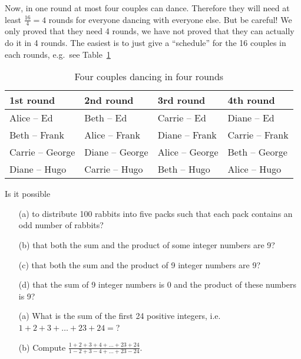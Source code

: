 Now, in one round at most four couples can dance. 
Therefore they will need at least $\frac{16}{4} = 4$ rounds for everyone dancing with everyone else. 
But be careful! 
We only proved that they need 4 rounds, 
we have not proved that they can actually do it in 4 rounds. 
The easiest is to just give a ``schedule'' for the 16 couples in each rounds, e.g.\ see Table~\ref{tab:dancing}
\begin{table}[!htbp]
\caption{Four couples dancing in four rounds}\label{tab:dancing}
\begin{center}
\begin{tabular}{llll}
1st round & 2nd round & 3rd round & 4th round \\
\hline
Alice -- Ed & Beth -- Ed & Carrie -- Ed & Diane -- Ed \\
Beth -- Frank & Alice -- Frank & Diane -- Frank & Carrie -- Frank \\
Carrie -- George & Diane -- George & Alice -- George & Beth -- George \\
Diane -- Hugo & Carrie -- Hugo & Beth -- Hugo & Alice -- Hugo 
\end{tabular}
\end{center}
\end{table}
\vfill\eject

\begin{exercise}\label{ex:isitpossible1}
Is it possible
\begin{enumerate}
\item[(a)] 
to distribute 100 rabbits into five packs such that each pack contains an odd number of rabbits? 
\item[(b)] 
that both the sum and the product of some integer numbers are 9? 
\item[(c)] 
that both the sum and the product of 9 integer numbers are 9? 
\item[(d)] 
that the sum of 9 integer numbers is 0 and the product of these numbers is 9? 
\end{enumerate}
\end{exercise}

\begin{exercise}\label{ex:sum24}
\begin{enumerate}
\item[(a)] What is the sum of the first 24 positive integers, i.e.\ $1 + 2 + 3 + \dots + 23 + 24 = $?
\item[(b)] Compute $\frac{1 + 2 + 3 + 4 + \dots + 23 + 24}{1 - 2 + 3 - 4 +  \dots + 23 - 24}$. 
\end{enumerate}
\end{exercise}

